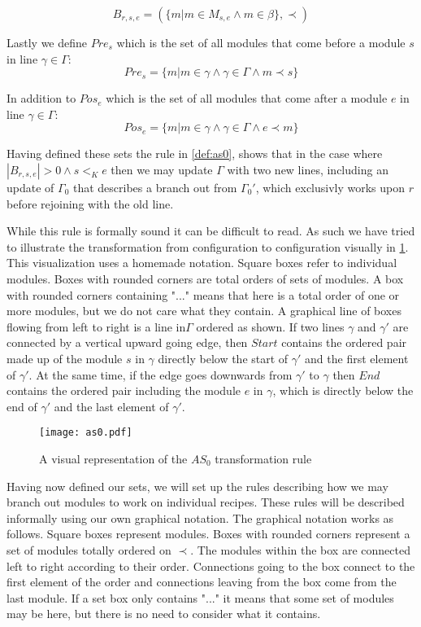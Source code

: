 \[B_{r,s,e} = (\{m |m \in M_{s,e} \land m \in \beta\}, \prec)\]

Lastly we define $Pre_{s}$ which is the set of all modules that come before a module $s$ in line $\gamma \in \Gamma$:
\[Pre_{s} = \{m | m \in \gamma \land \gamma \in \Gamma \land m \prec s\}\]

In addition to $Pos_{e}$ which is the set of all modules that come after a module $e$  in line $\gamma \in \Gamma$:
\[Pos_{e} = \{m | m \in \gamma \land \gamma \in \Gamma \land e \prec  m \}\]

Having defined these sets the rule in \cref{def:as0}, shows that in the case where $|B_{r,s,e}| > 0 \land s <_K e$ then we may update $\Gamma$ with two new lines, including an update of $\Gamma_0$ that describes a branch out from $\Gamma_0'$, which exclusivly works upon $r$ before rejoining with the old line.   

While this rule is formally sound it can be difficult to read. As such we have tried to illustrate the transformation from configuration to configuration visually in \cref{fig:as0}. This visualization uses a homemade notation. Square boxes refer to individual modules. Boxes with rounded corners are total orders of sets of modules. A box with rounded corners containing "..." means that here is a total order of one or more modules, but we do not care what they contain. A graphical line of boxes flowing from left to right is a line in$ \Gamma$ ordered as shown. If two lines $\gamma$ and $\gamma'$ are connected by a vertical upward going edge, then $Start$ contains the ordered pair made up of the module $s$ in $\gamma$ directly below the start of $\gamma'$ and the first element of $\gamma'$. At the same time, if the edge goes downwards from $\gamma'$ to $\gamma$ then $End$ contains the ordered pair including the module $e$ in $\gamma$, which is directly below the end of $\gamma'$ and the last element of $\gamma'$. 

\begin{figure}[H]
\centering
\texttt{[image: as0.pdf]}
\caption{A visual representation of the $AS_0$ transformation rule}
\label{fig:as0}
\end{figure}

Having now defined our sets, we will set up the rules describing how we may branch out modules to work on individual recipes. These rules will be described informally using our own graphical notation. The graphical notation works as follows. Square boxes represent modules. Boxes with rounded corners represent a set of modules totally ordered on $\prec$. The modules within the box are connected left to right according to their order. Connections going to the box connect to the first element of the order and connections leaving from the box come from the last module. If a set box only contains "..." it means that some set of modules may be here, but there is no need to consider what it contains. 

